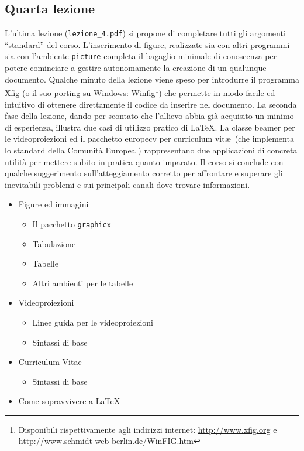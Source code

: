 \documentclass[a4paper,12pt]{article}
\begin{document}
\subsection{Quarta lezione}
L'ultima lezione (\texttt{lezione\_4.pdf}) si propone di completare
tutti gli argomenti ``standard'' del corso. L'inserimento di figure,
realizzate sia con altri programmi sia con l'ambiente \texttt{picture}
completa il bagaglio minimale di conoscenza per potere cominciare a
gestire autonomamente la creazione di un qualunque documento. Qualche
minuto della lezione viene speso per introdurre il programma
\textsf{Xfig} (o il suo porting su Windows:
\textsf{Winfig}\footnote{Disponibili rispettivamente agli indirizzi
internet: \url{http://www.xfig.org} e
\url{http://www.schmidt-web-berlin.de/WinFIG.htm}}) che permette in
modo facile ed intuitivo di ottenere direttamente il codice da
inserire nel documento. La seconda fase della lezione, dando per
scontato che l'allievo abbia gi\`a acquisito un minimo di esperienza,
illustra due casi di utilizzo pratico di \LaTeX. La classe
\textsf{beamer} per le videoproiezioni\cite{TAN} ed il pacchetto
\textsf{europecv} per curriculum vit\ae\ (che implementa lo standard
della Comunit\`a Europea \cite{VTC}) rappresentano due applicazioni di
concreta utilit\`a per mettere subito in pratica quanto imparato. Il
corso si conclude con qualche suggerimento sull'atteggiamento corretto
per affrontare e superare gli inevitabili problemi e sui principali
canali dove trovare informazioni.
		\begin{itemize}
		\item Figure ed immagini
			\begin{itemize}
			\item Il pacchetto \texttt{graphicx}
			\item Tabulazione
			\item Tabelle
			\item Altri ambienti per le tabelle
			\end{itemize}
		\item Videoproiezioni
			\begin{itemize}
			\item Linee guida per le videoproiezioni
			\item Sintassi di base
			\end{itemize}
		\item Curriculum Vitae
			\begin{itemize}
			\item Sintassi di base
			\end{itemize}
		\item Come sopravvivere a \LaTeX
		\end{itemize}
\end{document}
